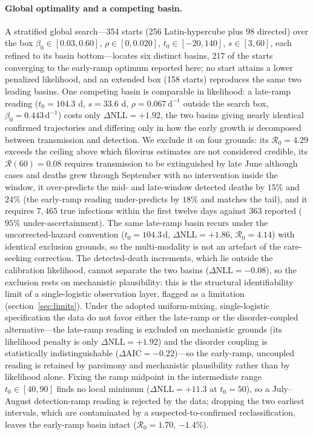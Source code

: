 \documentclass[preprint,12pt,numbers]{elsarticle}
\newcommand{\Reff}{\mathcal{R}}
\begin{document}
\paragraph{Global optimality and a competing basin.}
A stratified global search---354 starts (256 Latin-hypercube plus 98
directed) over the box $\beta_0\in[0.03,0.60]$,
$\rho\in[0,0.020]$, $t_0\in[-20,140]$, $s\in[3,60]$, each refined to
its basin bottom---locates six distinct basins, 217 of the starts
converging to the early-ramp optimum reported here; no start attains a
lower penalized likelihood, and an extended box (158 starts) reproduces
the same two leading basins. One competing basin is comparable in
likelihood: a late-ramp reading ($t_0=104.3$ d, $s=33.6$ d,
$\rho=0.067\,\mathrm{d}^{-1}$ outside the search box,
$\beta_0=0.443\,\mathrm{d}^{-1}$) costs only $\Delta\mathrm{NLL}=+1.92$, the
two basins giving nearly identical confirmed trajectories and
differing only in how the early growth is decomposed between
transmission and detection. We exclude it on four grounds: its
$\Reff_0=4.29$ exceeds the ceiling above which filovirus estimates are
not considered credible, its $\Reff(60)=0.08$ requires transmission to
be extinguished by late June although cases and deaths grew through
September with no intervention inside the window, it over-predicts the
mid- and late-window detected deaths by $15\%$ and $24\%$ (the
early-ramp reading under-predicts by $18\%$ and matches the tail), and
it requires $7{,}465$ true infections within the first twelve days
against $363$ reported ($95\%$ under-ascertainment). The same late-ramp
basin recurs under the uncorrected-hazard convention
($t_0=104.3\,\mathrm{d}$, $\Delta\mathrm{NLL}=+1.86$, $\Reff_0=4.14$) with
identical exclusion grounds, so the multi-modality is not an artefact
of the care-seeking correction. The detected-death increments, which lie outside the calibration
likelihood, cannot separate the two basins
($\Delta\mathrm{NLL}=-0.08$), so the exclusion rests on mechanistic
plausibility: this is the structural identifiability limit of a
single-logistic observation layer, flagged as a limitation
(section~\ref{sec:limits}). Under the adopted uniform-mixing,
single-logistic specification the data do not favor either the late-ramp
or the disorder-coupled alternative---the late-ramp reading is excluded
on mechanistic grounds (its likelihood penalty is only
$\Delta\mathrm{NLL}=+1.92$) and the disorder coupling is statistically
indistinguishable ($\Delta\mathrm{AIC}=-0.22$)---so the early-ramp,
uncoupled reading is retained by parsimony and mechanistic plausibility
rather than by likelihood alone. Fixing the ramp midpoint in the
intermediate range $t_0\in[40,90]$ finds no local minimum
($\Delta\mathrm{NLL}=+11.3$ at $t_0=50$), so a July--August
detection-ramp reading is rejected by the data; dropping the two
earliest intervals, which are contaminated by a suspected-to-confirmed
reclassification, leaves the early-ramp basin intact
($\Reff_0=1.70$, $-1.4\%$).
\end{document}
